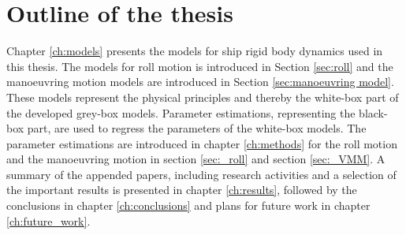\section{Outline of the thesis}
Chapter \ref{ch:models} presents the models for ship rigid body dynamics used in this thesis. The models for roll motion is introduced in Section \ref{sec:roll} and the manoeuvring motion models are introduced in Section \ref{sec:manoeuvring model}. These models represent the physical principles and thereby the white-box part of the developed grey-box models.
Parameter estimations, representing the black-box part, are used to regress the parameters of the white-box models. The parameter estimations are introduced in chapter \ref{ch:methods} for the roll motion and the manoeuvring motion in section \ref{sec:_roll} and section \ref{sec:_VMM}. 
A summary of the appended papers, including research activities and a selection of the important results is presented in chapter \ref{ch:results}, followed by the conclusions in chapter \ref{ch:conclusions} and plans for future work in chapter \ref{ch:future_work}.